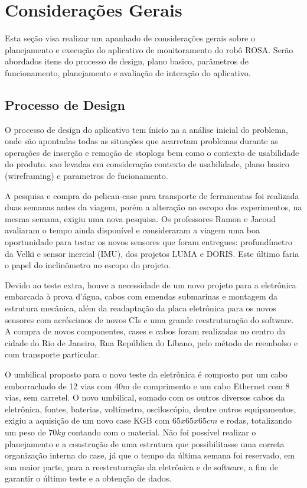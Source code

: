 \section{Considerações Gerais}
Esta seção visa realizar um apanhado de considerações gerais sobre o
planejamento e execução do aplicativo de monitoramento do robô ROSA. Serão
abordados itens do processo de design, plano basico,
parâmetros de funcionamento, planejamento e avaliação de interação do
aplicativo.

\subsection{Processo de Design}
O processo de design do aplicativo tem ínicio na a análise inicial do
problema, onde são apontadas todas as situações que acarretam pro\-ble\-mas
durante as opera\-ções de inserção e remoção de stoplogs bem como o contexto de
usabilidade do produto. sao levadas em consideração
contexto de usabilidade, plano basico (wireframing) e parametros de fucionamento.



A pesquisa e compra do pelican-case para transporte de ferramentas foi
realizada duas semanas antes da viagem, porém a alteração no escopo dos experimentos, na mesma
semana, exigiu uma nova pesquisa. Os professores Ramon e Jacoud avaliaram o
tempo ainda disponível e consideraram a viagem uma boa oportunidade para testar
os novos sensores que foram entregues:
profundímetro da Velki e sensor inercial (IMU), dos projetos LUMA e DORIS. Este
último faria o papel do inclinômetro no escopo do projeto. 

Devido ao teste extra, houve a necessidade de um novo projeto para a eletrônica
embarcada à prova d'água, cabos com emendas submarinas e montagem da estrutura mecânica, além da readaptação da placa eletrônica para os novos sensores com acréscimos de novos
CIs e uma grande reestruturação do software. A compra de novos componentes,
cases e cabos foram realizadas no centro da cidade do Rio de Janeiro, Rua
República do Líbano, pelo método de reembolso e com transporte particular.

O umbilical proposto para o novo teste da eletrônica é composto por um cabo
emborrachado de 12 vias com 40m de comprimento e um cabo Ethernet com 8 vias,
sem carretel.
O novo umbilical, somado com os outros diversos cabos da eletrônica, fontes,
baterias, voltímetro, osciloscópio, dentre outros equipamentos, exigiu a
aquisição de um novo case KGB com $65x65x65cm$ e rodas, totalizando um peso de
$70kg$ contando com o material.
Não foi possível realizar o planejamento e a construção de uma estrutura que
possibilitasse uma correta organização interna do case, já que o tempo da
última semana foi reservado, em sua maior parte, para a reestruturação da eletrônica e de software, a fim de garantir o último teste e a obtenção de dados.

